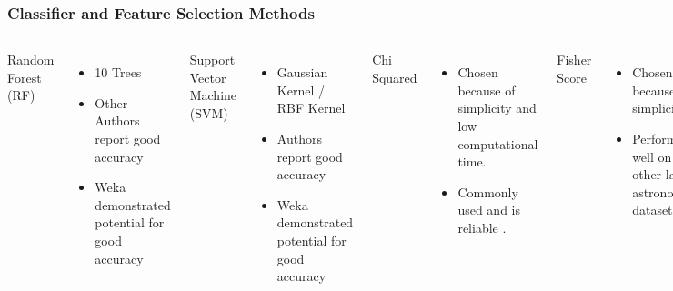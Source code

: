 \documentclass[aspectratio=169]{beamer}
\begin{document}
\begin{frame}
\frametitle{Classifier and Feature Selection Methods}

  \begin{block}

    \begin{columns}[t]

Random Forest (RF)
	\begin{itemize}
	\item 10 Trees
	\item Other Authors report good accuracy \cite{YI}
	\item Weka demonstrated potential for good accuracy
	\end{itemize}

Support Vector Machine (SVM)
	\begin{itemize}
	\item Gaussian Kernel / RBF Kernel
	\item Authors report good accuracy \cite{Xing}
	\item Weka demonstrated potential for good accuracy
	\end{itemize}

	
Chi Squared
\begin{itemize}
\item Chosen because of simplicity and low computational time.
\item Commonly used and is reliable \cite{Canedo}.
\end{itemize}

Fisher Score
\begin{itemize}
\item Chosen because of simplicity.
\item Performed well on other large astronomical datasets \cite{Zheng}.
\end{itemize}

    \end{columns}
  \end{block}

\end{frame}
\end{document}
